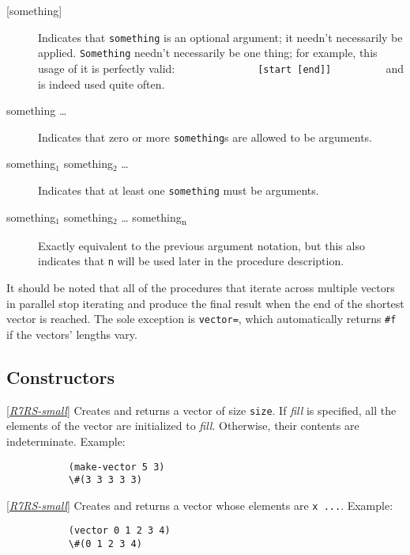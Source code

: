 \begin{description}
\item[{[}something{]}]
Indicates that \texttt{something} is an optional argument; it needn't
necessarily be applied. \texttt{Something} needn't necessarily be one
thing; for example, this usage of it is perfectly
valid:
\texttt{\ \ \ \ \ \ \ \ \ \ \ ~~~{[}start\ {[}end{]}{]}\ \ \ \ \ \ \ \ \ }
and
is indeed used quite often.

\item[something \ldots{}]
Indicates that zero or more \texttt{something}s are allowed to be
arguments.

\item[ something$_1$ something$_2$ \ldots{} ]
Indicates that at least one \texttt{something} must be
arguments.

\item[ something$_1$ something$_2$ \ldots{}
something\textsubscript{n} ]
Exactly equivalent to the previous argument notation, but this also
indicates that \texttt{n} will be used later in the procedure
description.

\end{description}

It should be noted that all of the procedures that iterate across
multiple vectors in parallel stop iterating and produce the final result
when the end of the shortest vector is reached. The sole exception is
\texttt{vector=}, which automatically returns \texttt{\#f} if the
vectors' lengths vary.

\subsection{Constructors}

\begin{entry}{%
  }

  {[}\protect\hyperlink{R7RS-small}{\emph{R7RS-small}}{]} Creates
  and returns a vector of size \texttt{size}. If \emph{fill} is
  specified, all the elements of the vector are initialized to
  \emph{fill}. Otherwise, their contents are indeterminate.  Example:
\begin{verbatim}
           (make-vector 5 3)         
           \#(3 3 3 3 3)         
\end{verbatim}
\end{entry}

\begin{entry}{%
  }

  {[}\protect\hyperlink{R7RS-small}{\emph{R7RS-small}}{]} Creates and
  returns a vector whose elements are \texttt{x\ ...}.  Example:
\begin{verbatim}
           (vector 0 1 2 3 4)         
           \#(0 1 2 3 4)         
\end{verbatim}
\end{entry}

